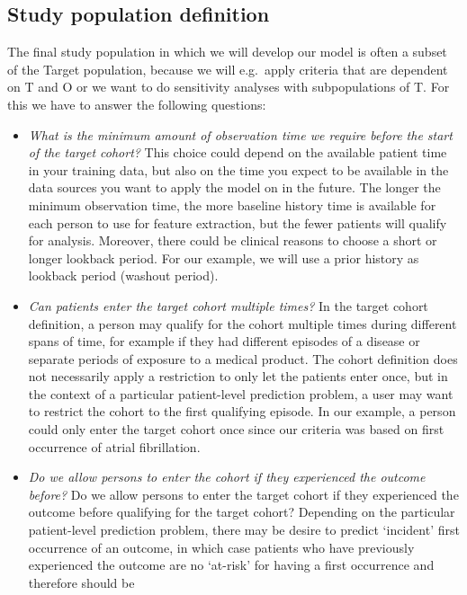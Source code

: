 \documentclass[]{article}
\begin{document}
\subsection{Study population
definition}\label{study-population-definition}

The final study population in which we will develop our model is often a
subset of the Target population, because we will e.g.~apply criteria
that are dependent on T and O or we want to do sensitivity analyses with
subpopulations of T. For this we have to answer the following questions:

\begin{itemize}
\item
  \emph{What is the minimum amount of observation time we require before
  the start of the target cohort?} This choice could depend on the
  available patient time in your training data, but also on the time you
  expect to be available in the data sources you want to apply the model
  on in the future. The longer the minimum observation time, the more
  baseline history time is available for each person to use for feature
  extraction, but the fewer patients will qualify for analysis.
  Moreover, there could be clinical reasons to choose a short or longer
  lookback period. For our example, we will use a prior history as
  lookback period (washout period).
\item
  \emph{Can patients enter the target cohort multiple times?} In the
  target cohort definition, a person may qualify for the cohort multiple
  times during different spans of time, for example if they had
  different episodes of a disease or separate periods of exposure to a
  medical product. The cohort definition does not necessarily apply a
  restriction to only let the patients enter once, but in the context of
  a particular patient-level prediction problem, a user may want to
  restrict the cohort to the first qualifying episode. In our example, a
  person could only enter the target cohort once since our criteria was
  based on first occurrence of atrial fibrillation.
\item
  \emph{Do we allow persons to enter the cohort if they experienced the
  outcome before?} Do we allow persons to enter the target cohort if
  they experienced the outcome before qualifying for the target cohort?
  Depending on the particular patient-level prediction problem, there
  may be desire to predict `incident' first occurrence of an outcome, in
  which case patients who have previously experienced the outcome are no
  `at-risk' for having a first occurrence and therefore should be

\end{itemize}
\end{document}
